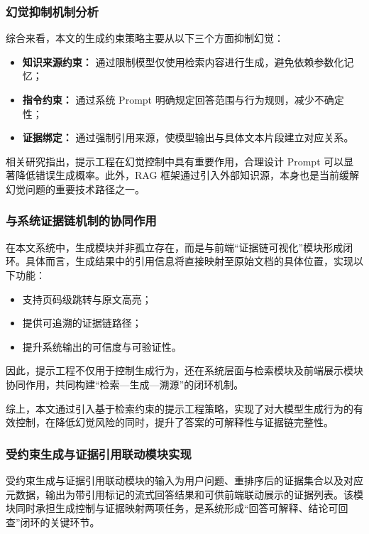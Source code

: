\documentclass[UTF8,a4paper,zihao=-4]{ctexart}
\begin{document}
\subsubsection{幻觉抑制机制分析}

综合来看，本文的生成约束策略主要从以下三个方面抑制幻觉：

\begin{itemize}
    \item \textbf{知识来源约束：} 通过限制模型仅使用检索内容进行生成，避免依赖参数化记忆；
    
    \item \textbf{指令约束：} 通过系统 Prompt 明确规定回答范围与行为规则，减少不确定性；
    
    \item \textbf{证据绑定：} 通过强制引用来源，使模型输出与具体文本片段建立对应关系。
\end{itemize}

相关研究指出，提示工程在幻觉控制中具有重要作用，合理设计 Prompt 可以显著降低错误生成概率。此外，RAG 框架通过引入外部知识源，本身也是当前缓解幻觉问题的重要技术路径之一。

\subsubsection{与系统证据链机制的协同作用}

在本文系统中，生成模块并非孤立存在，而是与前端“证据链可视化”模块形成闭环。具体而言，生成结果中的引用信息将直接映射至原始文档的具体位置，实现以下功能：

\begin{itemize}
    \item 支持页码级跳转与原文高亮；
    \item 提供可追溯的证据链路径；
    \item 提升系统输出的可信度与可验证性。
\end{itemize}

因此，提示工程不仅用于控制生成行为，还在系统层面与检索模块及前端展示模块协同作用，共同构建“检索—生成—溯源”的闭环机制。

综上，本文通过引入基于检索约束的提示工程策略，实现了对大模型生成行为的有效控制，在降低幻觉风险的同时，提升了答案的可解释性与证据链完整性。

\subsubsection{受约束生成与证据引用联动模块实现}

受约束生成与证据引用联动模块的输入为用户问题、重排序后的证据集合以及对应元数据，输出为带引用标记的流式回答结果和可供前端联动展示的证据列表。该模块同时承担生成控制与证据映射两项任务，是系统形成“回答可解释、结论可回查”闭环的关键环节。
\end{document}
